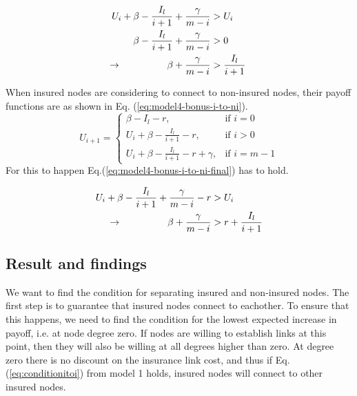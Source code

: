 \begin{eqnarray}
U_{i}+\beta-\frac{I_{l}}{i+1}+\frac{\gamma}{m-i}&>U_{i} \nonumber \\ 
\beta-\frac{I_{l}}{i+1}+\frac{\gamma}{m-i}&>0 \nonumber \\ 
\llap{$\rightarrow$\hspace{50pt}}\beta +\frac{\gamma}{m-i}&>\frac{I_{l}}{i+1}
\label{eq:model4-bonus-i-to-i}
\end{eqnarray}

When insured nodes are considering to connect to non-insured nodes, their payoff functions are as shown in Eq. (\ref{eq:model4-bonus-i-to-ni}).
\begin{equation}
U_{i+1}= 
\begin{cases}
    \beta - I_{l}-r,& \text{if } i = 0\\
    U_{i}+\beta -\frac{I_{l}}{i+1}-r,& \text{if }  i>0\\
    U_{i}+\beta -\frac{I_{l}}{i+1}-r+\gamma,& \text{if } i=m-1
\end{cases}
\label{eq:model4-bonus-i-to-ni}
\end{equation}
For this to happen Eq.(\ref{eq:model4-bonus-i-to-ni-final}) has to hold.

\begin{eqnarray}
U_{i}+\beta-\frac{I_{l}}{i+1}+\frac{\gamma}{m-i}-r&>U_{i} \nonumber \\ 
\llap{$\rightarrow$\hspace{50pt}}\beta+\frac{\gamma}{m-i}&>r+\frac{I_{l}}{i+1}
\label{eq:model4-bonus-i-to-ni-final}
\end{eqnarray}

\subsection{Result and findings}

We want to find the condition for separating insured and non-insured nodes. The first step is to guarantee that insured nodes connect to eachother. To ensure that this happens, we need to find the condition for the lowest expected increase in payoff, i.e. at node degree zero. If nodes are willing to establish links at this point, then they will also be willing at all degrees higher than zero.
At degree zero there is no discount on the insurance link cost, and thus if Eq.(\ref{eq:conditionitoi}) from model 1 holds, insured nodes will connect to other insured nodes.

